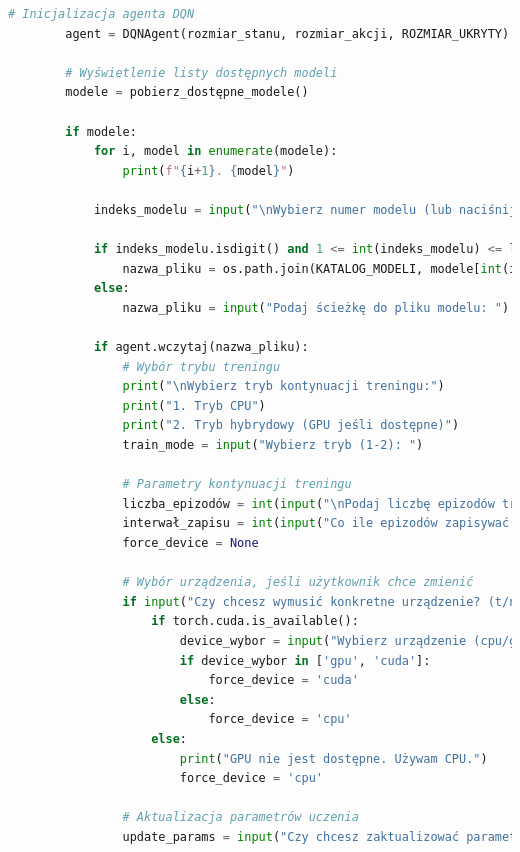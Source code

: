 \documentclass[a4paper,12pt]{article}
\begin{document}
\begin{lstlisting}[language=Python]
        # Inicjalizacja agenta DQN
        agent = DQNAgent(rozmiar_stanu, rozmiar_akcji, ROZMIAR_UKRYTY)
    
        # Wyświetlenie listy dostępnych modeli
        modele = pobierz_dostępne_modele()
    
        if modele:
            for i, model in enumerate(modele):
                print(f"{i+1}. {model}")
        
            indeks_modelu = input("\nWybierz numer modelu (lub naciśnij Enter, aby wpisać własną nazwę pliku): ")
        
            if indeks_modelu.isdigit() and 1 <= int(indeks_modelu) <= len(modele):
                nazwa_pliku = os.path.join(KATALOG_MODELI, modele[int(indeks_modelu)-1])
            else:
                nazwa_pliku = input("Podaj ścieżkę do pliku modelu: ")
        
            if agent.wczytaj(nazwa_pliku):
                # Wybór trybu treningu
                print("\nWybierz tryb kontynuacji treningu:")
                print("1. Tryb CPU")
                print("2. Tryb hybrydowy (GPU jeśli dostępne)")
                train_mode = input("Wybierz tryb (1-2): ")
            
                # Parametry kontynuacji treningu
                liczba_epizodów = int(input("\nPodaj liczbę epizodów treningu: ") or "100")
                interwał_zapisu = int(input("Co ile epizodów zapisywać model: ") or "10")
                force_device = None
            
                # Wybór urządzenia, jeśli użytkownik chce zmienić
                if input("Czy chcesz wymusić konkretne urządzenie? (t/n): ").lower() == 't':
                    if torch.cuda.is_available():
                        device_wybor = input("Wybierz urządzenie (cpu/gpu): ").lower()
                        if device_wybor in ['gpu', 'cuda']:
                            force_device = 'cuda'
                        else:
                            force_device = 'cpu'
                    else:
                        print("GPU nie jest dostępne. Używam CPU.")
                        force_device = 'cpu'
            
                # Aktualizacja parametrów uczenia
                update_params = input("Czy chcesz zaktualizować parametry uczenia? (t/n): ").lower() == 't'
            

\end{lstlisting}
\end{document}
